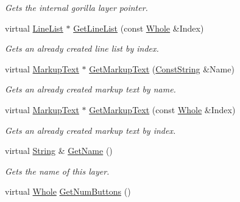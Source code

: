\begin{DoxyCompactItemize}
\begin{DoxyCompactList}\small\item\em Gets the internal gorilla layer pointer. \item\end{DoxyCompactList}\item 
virtual \hyperlink{classMezzanine_1_1UI_1_1LineList}{LineList} $\ast$ \hyperlink{classMezzanine_1_1UI_1_1Layer_a58684b937a96e2a5cb911fae520e4d1f}{GetLineList} (const \hyperlink{namespaceMezzanine_adcbb6ce6d1eb4379d109e51171e2e493}{Whole} \&Index)
\begin{DoxyCompactList}\small\item\em Gets an already created line list by index. \item\end{DoxyCompactList}\item 
virtual \hyperlink{classMezzanine_1_1UI_1_1MarkupText}{MarkupText} $\ast$ \hyperlink{classMezzanine_1_1UI_1_1Layer_a172322ba8c4c27d5c59aa8b077e9e150}{GetMarkupText} (\hyperlink{namespaceMezzanine_a63cd699ac54b73953f35ec9cfc05e506}{ConstString} \&Name)
\begin{DoxyCompactList}\small\item\em Gets an already created markup text by name. \item\end{DoxyCompactList}\item 
virtual \hyperlink{classMezzanine_1_1UI_1_1MarkupText}{MarkupText} $\ast$ \hyperlink{classMezzanine_1_1UI_1_1Layer_a9d68b5d2587065884ec2796851e31166}{GetMarkupText} (const \hyperlink{namespaceMezzanine_adcbb6ce6d1eb4379d109e51171e2e493}{Whole} \&Index)
\begin{DoxyCompactList}\small\item\em Gets an already created markup text by index. \item\end{DoxyCompactList}\item 
virtual \hyperlink{namespaceMezzanine_acf9fcc130e6ebf08e3d8491aebcf1c86}{String} \& \hyperlink{classMezzanine_1_1UI_1_1Layer_a2ceb695a51dd1e4619523e7f2e777ebc}{GetName} ()
\begin{DoxyCompactList}\small\item\em Gets the name of this layer. \item\end{DoxyCompactList}\item 
virtual \hyperlink{namespaceMezzanine_adcbb6ce6d1eb4379d109e51171e2e493}{Whole} \hyperlink{classMezzanine_1_1UI_1_1Layer_ae339d1ec2ff0c141225ec86167be5e31}{GetNumButtons} ()

\end{DoxyCompactItemize}

